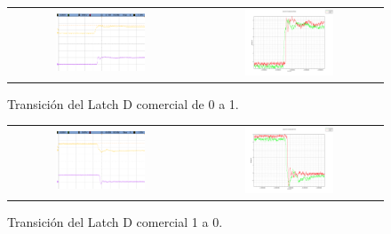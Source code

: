 \begin{figure}[H]
    \centering
    \begin{tabular}{c c}
        \includegraphics[width=0.5\textwidth]{../EJ6/Recursos/com_latch_rise_osc} &
        \includegraphics[width=0.5\textwidth]{../EJ6/Recursos/com_latch_rise}
    \end{tabular}
    \caption{Transición del Latch D comercial de 0 a 1.}
    \label{fig:com_latch_rise_ex6}
\end{figure}

\begin{figure}[H]
    \centering
    \begin{tabular}{c c}
        \includegraphics[width=0.5\textwidth]{../EJ6/Recursos/com_latch_fall_osc} &
        \includegraphics[width=0.5\textwidth]{../EJ6/Recursos/com_latch_fall}
    \end{tabular}
    \caption{Transición del Latch D comercial 1 a 0.}
    \label{fig:com_latch_fall_ex6}
\end{figure}

